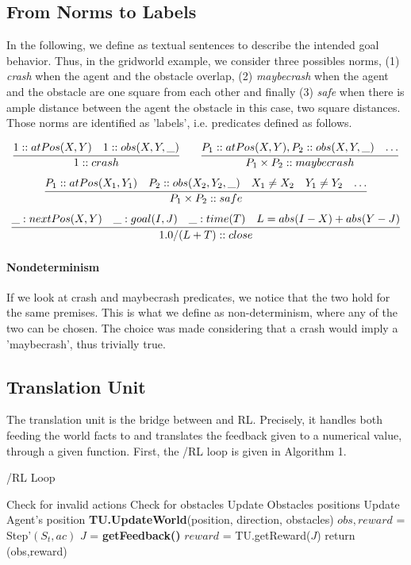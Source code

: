 \subsection{From Norms to Labels}
In the following, we define \textbf{} as textual sentences to describe the intended goal behavior. 
Thus, in the gridworld example, we consider three possibles norms, (1) \textit{crash} when the agent and the obstacle overlap, (2) \textit{maybecrash} 
when the agent and the obstacle are one square from each other and finally (3) \textit{safe} when there is ample distance between the agent the obstacle 
in this case, two square distances. Those norms are identified as 'labels', i.e. predicates defined as follows. 

\[
    \infer{1 :: crash}{1 :: atPos(X,Y) & 1 :: obs(X,Y,\_)} 
    \qquad
    \infer{P_1 \times P_2 :: maybecrash}{P_1::atPos(X,Y), P_2::obs(X,Y,\_)
      & \ldots}
\] 
\[
    \infer{P_1 \times P_2 :: safe}{
      P_1::atPos(X_1,Y_1) & P_2::obs(X_2,Y_2,\_) & X_1 \neq X_2 & Y_1 \neq Y_2
      & \ldots
    }
\]
\[
  \infer{1.0/(L+T) :: close}{
    \_:nextPos(X,Y) & \_:goal(I,J) & \_:time(T) & L = abs(I-X) + abs(Y-J)
  }
\]

 \paragraph{Nondeterminism} 
 If we look at crash and maybecrash predicates, we notice that the two hold for the 
 same premises. This is what we define as non-determinism, where any of the two can be chosen. 
 The choice was made considering that a crash would imply a 'maybecrash', thus trivially true. 

\subsection{Translation Unit}
The translation unit is the bridge between \dio{} and RL. Precisely, it handles both feeding 
the world facts to \dio{} and translates the feedback given to a numerical value, through 
a given function. First, the \dio{}/RL loop is given in Algorithm 1. 

  \begin{algorithm}[H]
    \caption{\dio{}/RL Loop}
    \begin{algorithmic}[1]
    
           
        \State Check for invalid actions
        \State Check for obstacles 
        \State Update Obstacles positions
        \State Update Agent's position
        \State \textbf{TU.UpdateWorld}(position, direction, obstacles) 
        \State $obs, reward$ = Step'$(S_t, ac)$ 
        \State $J$ = \textbf{getFeedback()} 
        \State $reward$ = TU.getReward($J$) 
        \State return (obs,reward)
    \EndProcedure
    
    \end{algorithmic}
    \end{algorithm}

